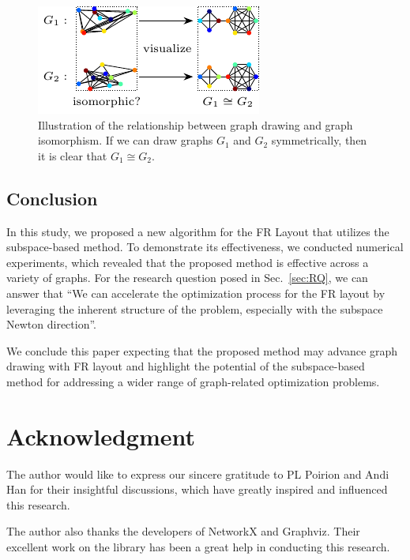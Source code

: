 \documentclass[dvipdfmx,journal]{IEEEtran}
\begin{document}
\begin{figure}[t]
    \centering
    \includegraphics[width=\columnwidth]{iso/iso.pdf}
    \caption{
        Illustration of the relationship between graph drawing and graph isomorphism.
        If we can draw graphs $G_1$ and $G_2$ symmetrically, then it is clear that $G_1 \cong G_2$.
    }
    \label{fig:iso}
\end{figure}

\subsection{Conclusion} \label{sec:conclusion}

In this study, we proposed a new algorithm for the FR Layout that utilizes the subspace-based method.
To demonstrate its effectiveness, we conducted numerical experiments, which revealed that the proposed method is effective across a variety of graphs. For the research question posed in Sec.~\ref{sec:RQ}, we can answer that ``We can accelerate the optimization process for the FR layout by leveraging the inherent structure of the problem, especially with the subspace Newton direction''.

We conclude this paper expecting that the proposed method may advance graph drawing with FR layout and highlight the potential of the subspace-based method for addressing a wider range of graph-related optimization problems.

\section{Acknowledgment}

The author would like to express our sincere gratitude to PL Poirion and Andi Han for their insightful discussions, which have greatly inspired and influenced this research.

The author also thanks the developers of NetworkX and Graphviz. Their excellent work on the library has been a great help in conducting this research.
\end{document}
